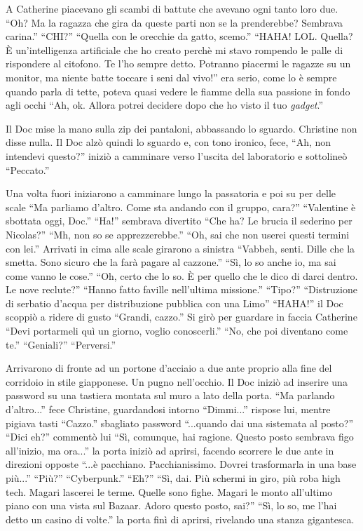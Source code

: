     A Catherine piacevano gli scambi di battute che avevano ogni tanto loro due. ``Oh? Ma la ragazza che gira da queste
    parti non se la prenderebbe? Sembrava carina.'' ``CHI?'' ``Quella con le orecchie da gatto, scemo.'' ``HAHA! LOL.
    Quella? È un'intelligenza artificiale che ho creato perchè mi stavo rompendo le palle di rispondere al citofono. Te
    l'ho sempre detto. Potranno piacermi le ragazze su un monitor, ma niente batte toccare i seni dal vivo!'' era serio,
    come lo è sempre quando parla di tette, poteva quasi vedere le fiamme della sua passione in fondo agli occhi ``Ah,
    ok. Allora potrei decidere dopo che ho visto il tuo \emph{gadget}.''

    Il Doc mise la mano sulla zip dei pantaloni, abbassando lo sguardo. Christine non disse nulla. Il Doc alzò quindi lo
    sguardo e, con tono ironico, fece, ``Ah, non intendevi questo?'' iniziò a camminare verso l'uscita del laboratorio e
    sottolineò ``Peccato.''

    Una volta fuori iniziarono a camminare lungo la passatoria e poi su per delle scale ``Ma parliamo d'altro. Come sta
    andando con il gruppo, cara?'' ``Valentine è sbottata oggi, Doc.'' ``Ha!'' sembrava divertito ``Che ha? Le brucia il
    sederino per Nicolas?'' ``Mh, non so se apprezzerebbe.'' ``Oh, sai che non userei questi termini con lei.'' Arrivati
    in cima alle scale girarono a sinistra ``Vabbeh, senti. Dille che la smetta. Sono sicuro che la farà pagare al
    cazzone.'' ``Sì, lo so anche io, ma sai come vanno le cose.'' ``Oh, certo che lo so. È per quello che le dico di
    darci dentro. Le nove reclute?'' ``Hanno fatto faville nell'ultima missione.'' ``Tipo?'' ``Distruzione di serbatio
    d'acqua per distribuzione pubblica con una Limo'' ``HAHA!'' il Doc scoppiò a ridere di gusto ``Grandi, cazzo.'' Si
    girò per guardare in faccia Catherine ``Devi portarmeli quì un giorno, voglio conoscerli.'' ``No, che poi diventano
    come te.'' ``Geniali?'' ``Perversi.''

    Arrivarono di fronte ad un portone d'acciaio a due ante proprio alla fine del corridoio in stile giapponese. Un
    pugno nell'occhio. Il Doc iniziò ad inserire una password su una tastiera montata sul muro a lato della porta.
    ``Ma parlando d'altro...'' fece Christine, guardandosi intorno ``Dimmi...'' rispose lui, mentre pigiava tasti
    ``Cazzo.'' sbagliato password ``...quando dai una sistemata al posto?'' ``Dici eh?'' commentò lui ``Sì, comunque,
    hai ragione. Questo posto sembrava figo all'inizio, ma ora...'' la porta iniziò ad aprirsi, facendo scorrere le due
    ante in direzioni opposte ``...è pacchiano. Pacchianissimo. Dovrei trasformarla in una base più...'' ``Più?''
    ``Cyberpunk.'' ``Eh?'' ``Sì, dai. Più schermi in giro, più roba high tech. Magari lascerei le terme. Quelle sono
    fighe. Magari le monto all'ultimo piano con una vista sul Bazaar. Adoro questo posto, sai?'' ``Sì, lo so, me l'hai
    detto un casino di volte.'' la porta finì di aprirsi, rivelando una stanza gigantesca.

